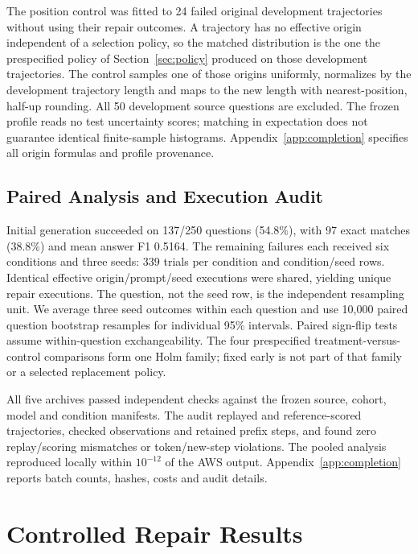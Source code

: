 \documentclass{article}
\begin{document}
The position control was fitted to 24 failed original development trajectories
without using their repair outcomes. A trajectory has no effective origin
independent of a selection policy, so the matched distribution is the one the
prespecified policy of Section~\ref{sec:policy} produced on those development
trajectories. The control samples one of those origins uniformly, normalizes
by the development trajectory length and maps to the new length with
nearest-position, half-up rounding. All 50 development source
questions are excluded. The frozen profile reads no test uncertainty scores;
matching in expectation does not guarantee identical finite-sample histograms.
Appendix~\ref{app:completion} specifies all origin formulas and profile provenance.

\subsection{Paired Analysis and Execution Audit}
Initial generation succeeded on 137/250 questions (54.8\%), with 97 exact
matches (38.8\%) and mean answer F1 0.5164. The remaining \MainFailed{}
failures each received six conditions and three seeds: 339 trials per
condition and \MainSeedRows{} condition/seed rows. Identical effective
origin/prompt/seed executions were shared, yielding \MainUniqueRepairs{}
unique repair executions. The question, not the seed row, is the independent
resampling unit. We average three seed outcomes within each question and use
10,000 paired question bootstrap resamples for individual 95\% intervals.
Paired sign-flip tests assume within-question exchangeability. The four
prespecified treatment-versus-control comparisons form one Holm family;
fixed early is not part of that family or a selected replacement policy.

All five archives passed independent checks against the frozen source,
cohort, model and condition manifests. The audit replayed and reference-scored
\MainTrajectories{} trajectories, checked \MainObservations{} observations
and \MainPrefixes{} retained prefix steps, and found zero replay/scoring
mismatches or token/new-step violations. The pooled analysis reproduced
locally within $10^{-12}$ of the AWS output. Appendix~\ref{app:completion}
reports batch counts, hashes, costs and audit details.

\section{Controlled Repair Results}
\label{sec:main_results}
\begin{table}[t]
\centering
\caption{Completed HotpotQA repair comparison on 113 initial failures, with
three seeds per condition. Success is answer EM or F1 $\geq0.5$; EM and F1
use the same cohort. The final column reports effective origin zero.
Fixed early is descriptive. Copied execution rows are not independent trials.}
\label{tab:main_results}
\small

\end{table}
\end{document}
